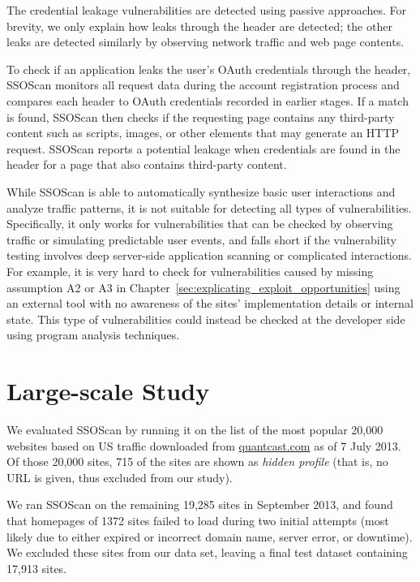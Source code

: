  The credential leakage vulnerabilities are detected using passive approaches.  For brevity, we only explain how leaks through the  header are detected; the other leaks are detected similarly by observing network traffic and web page contents.

To check if an application leaks the user's OAuth credentials through the  header, SSOScan monitors all request data during the account registration process and compares each  header to OAuth credentials recorded in earlier stages.  If a match is found, SSOScan then checks if the requesting page contains any third-party content such as scripts, images, or other elements that may generate an HTTP request.  SSOScan reports a potential leakage when credentials are found in the  header for a page that also contains third-party content.

  While SSOScan is able to automatically synthesize basic user interactions and analyze traffic patterns, it is not suitable for detecting all types of vulnerabilities.  Specifically, it only works for vulnerabilities that can be checked by observing traffic or simulating predictable user events, and falls short if the vulnerability testing involves deep server-side application scanning or complicated interactions.  For example, it is very hard to check for vulnerabilities caused by missing assumption A2 or A3 in Chapter~\ref{sec:explicating_exploit_opportunities} using an external tool with no awareness of the sites' implementation details or internal state.  This type of vulnerabilities could instead be checked at the developer side using program analysis techniques.

\section{Large-scale Study}
\label{sec:ssoscan_study}

We evaluated SSOScan by running it on the list of the most popular 20,000 websites based on US traffic downloaded from \url{quantcast.com} as of 7 July 2013.  Of those 20,000 sites, 715 of the sites are shown as \emph{hidden profile} (that is, no URL is given, thus excluded from our study).  

We ran SSOScan on the remaining 19,285 sites in September 2013, and found that homepages of 1372 sites failed to load during two initial attempts (most likely due to either expired or incorrect domain name, server error, or downtime).  We excluded these sites from our data set, leaving a final test dataset containing 17,913 sites.

